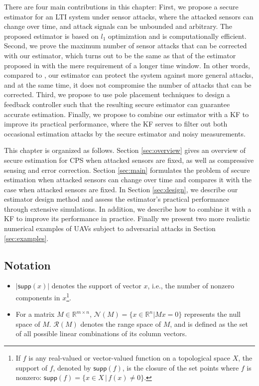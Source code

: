 \documentclass[../../thesis.tex]{subfiles}
\newcommand{\norm}[1]{\left\lVert#1\right\rVert}
\begin{document}
There are four main contributions in this chapter:
First, we propose a secure estimator for an LTI system under sensor attacks, where the attacked sensors can change over time, and attack signals can be unbounded and arbitrary.
The proposed estimator is based on $l_1$ optimization and is computationally efficient.
Second, we prove the maximum number of sensor attacks that can be corrected with our estimator, which turns out to be the same as that of the estimator proposed in \cite{Fawzi:2014} with the mere requirement of a longer time window. In other words, compared to \cite{Fawzi:2014}, our estimator can protect the system against more general attacks, and at the same time, it does not compromise the number of attacks that can be corrected.
Third, we propose to use pole placement techniques to design a feedback controller such that the resulting secure estimator can guarantee accurate estimation.
Finally, we propose to combine our estimator with a KF to improve its practical performance, where the KF serves to filter out both occasional estimation attacks by the secure estimator and noisy measurements.


This chapter is organized as follows. Section \ref{sec:overview} gives an overview of secure estimation for CPS when attacked sensors are fixed, as well as compressive sensing and error correction. Section \ref{sec:main} formulates the problem of secure estimation when attacked sensors can change over time and compares it with the case when attacked sensors are fixed. In Section \ref{sec:design}, we describe our estimator design method and assess the estimator's practical performance through extensive simulations. In addition, we describe how to combine it with a KF to improve its performance in practice. Finally we present two more realistic numerical examples of UAVs subject to adversarial attacks in Section \ref{sec:examples}. 

\subsection{Notation}
\begin{itemize}
\item 
$\lvert \textsf{supp} (x) \rvert $  denotes the support of vector $x$, i.e., the number of nonzero components in $x$\footnote{If $f$ is any real-valued or vector-valued function on a topological space $X$, the support of $f$, denoted by $\textsf{supp}(f)$, is the closure of the set points where $f$ is nonzero: $\textsf{supp}(f)  = \{ x \in X \,|\, f(x) \neq 0 \}$.}. 
\item  
For a matrix $M \in \mathbb{R}^{m \times n}$, $\mathcal{N} (M) = \{ x \in \mathbb{R}^n \lvert M x = 0 \}$ represents the null space of $M$. $\mathcal{R}(M)$ denotes the range space of $M$, and is defined as the set of all possible linear combinations of its column vectors.
\end{itemize}
\end{document}
